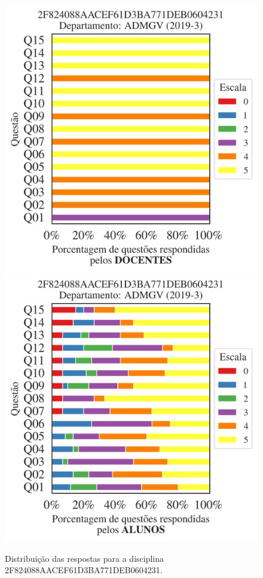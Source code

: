 \documentclass[a4paper,10pt]{article}
\begin{document}
\begin{figure}[h]
\centering
\includegraphics[width=0.485\linewidth]{analise_disciplina_departamento_ADMGV_2F824088AACEF61D3BA771DEB0604231_docentes.png}
\includegraphics[width=0.485\linewidth]{analise_disciplina_departamento_ADMGV_2F824088AACEF61D3BA771DEB0604231_alunos.png}
\caption{\label{fig:analise_geral_departamento}                Distribuição das respostas para a disciplina 2F824088AACEF61D3BA771DEB0604231. }
\end{figure}
\end{document}
